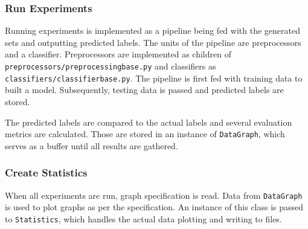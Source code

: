\subsubsection{Run Experiments}

Running experiments is implemented as a pipeline being fed with the generated sets and outputting predicted labels.
The units of the pipeline are preprocessors and a classifier.
Preprocessors are implemented as children of \texttt{preprocessors/preprocessingbase.py} and classifiers
as \texttt{classifiers/classifierbase.py}.
The pipeline is first fed with training data to built a model.
Subsequently, testing data is passed and predicted labels are stored.

The predicted labels are compared to the actual labels and several evaluation metrics are calculated.
Those are stored in an instance of \texttt{DataGraph}, which serves as a buffer until all results are gathered.

\subsubsection{Create Statistics}

When all experiments are run, graph specification is read.
Data from \texttt{DataGraph} is used to plot graphs as per the specification.
An instance of this class is passed to \texttt{Statistics},
which handles the actual data plotting and writing to files.
